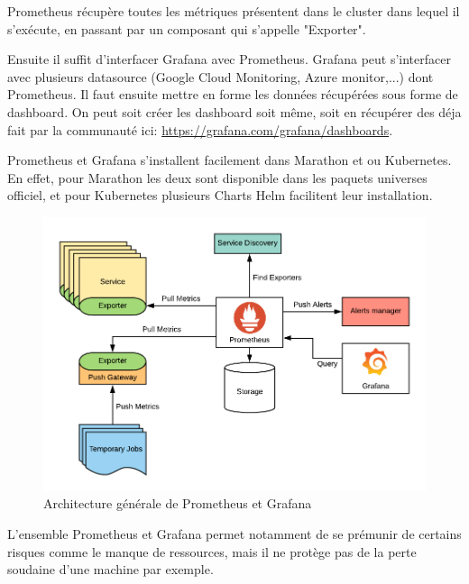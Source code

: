 \documentclass[11pt,fleqn]{book} %
\begin{document}
Prometheus récupère toutes les métriques présentent dans le cluster dans lequel il s'exécute,  en passant par un composant qui s’appelle "Exporter". \newline

Ensuite il suffit d'interfacer Grafana avec Prometheus. Grafana peut s'interfacer avec plusieurs datasource (Google Cloud Monitoring, Azure monitor,...) dont Prometheus. Il faut ensuite mettre en forme les données récupérées sous forme de dashboard. On peut soit créer les dashboard soit même, soit en récupérer des déja fait par la communauté ici: \url{https://grafana.com/grafana/dashboards}.\newline 

Prometheus et Grafana s'installent facilement dans Marathon et ou Kubernetes. En effet, pour Marathon les deux sont disponible dans les paquets universes officiel, et pour Kubernetes plusieurs Charts Helm facilitent leur installation.

\begin{figure}[H]\centering
\renewcommand{\figurename}{Schéma}
\includegraphics[scale=1]{Pictures/annexe/architecture.png}
\captionsetup{margin=1.5cm,format=hang,justification=justified}
\caption[]{Architecture générale de Prometheus et Grafana \newline}
\end{figure}

L'ensemble Prometheus et Grafana permet notamment de se prémunir de certains risques comme le manque de ressources, mais il ne protège pas de la perte soudaine d'une machine par exemple.\newline
\end{document}
